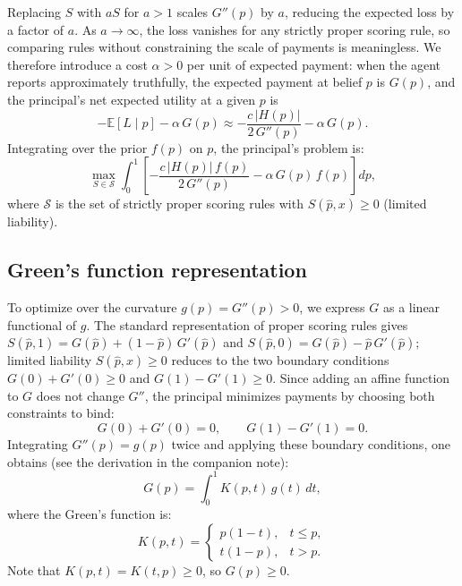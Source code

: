 \documentclass[11pt]{article}
\begin{document}
Replacing $S$ with $aS$ for $a > 1$ scales $G''(p)$ by $a$, reducing the expected loss by a factor of $a$. As $a \to \infty$, the loss vanishes for any strictly proper scoring rule, so comparing rules without constraining the scale of payments is meaningless. We therefore introduce a cost $\alpha > 0$ per unit of expected payment: when the agent reports approximately truthfully, the expected payment at belief $p$ is $G(p)$, and the principal's net expected utility at a given $p$ is
\[
-\mathbb{E}[L \mid p] - \alpha\,G(p) \approx -\frac{c\,|H(p)|}{2\,G''(p)} - \alpha\,G(p).
\]
Integrating over the prior $f(p)$ on $p$, the principal's problem is:
\begin{equation}\label{eq:ri-principal-problem}
\max_{S \in \mathcal{S}} \int_0^1 \left[-\frac{c\,|H(p)|\,f(p)}{2\,G''(p)} - \alpha\,G(p)\,f(p)\right] dp,
\end{equation}
where $\mathcal{S}$ is the set of strictly proper scoring rules with $S(\hat{p},x) \geq 0$ (limited liability).

\subsection{Green's function representation}

To optimize over the curvature $g(p) = G''(p) > 0$, we express $G$ as a linear functional of $g$. The standard representation of proper scoring rules gives $S(\hat{p},1) = G(\hat{p}) + (1-\hat{p})\,G'(\hat{p})$ and $S(\hat{p},0) = G(\hat{p}) - \hat{p}\,G'(\hat{p})$; limited liability $S(\hat{p},x) \geq 0$ reduces to the two boundary conditions $G(0) + G'(0) \geq 0$ and $G(1) - G'(1) \geq 0$. Since adding an affine function to $G$ does not change $G''$, the principal minimizes payments by choosing both constraints to bind:
\[
G(0) + G'(0) = 0, \qquad G(1) - G'(1) = 0.
\]
Integrating $G''(p) = g(p)$ twice and applying these boundary conditions, one obtains (see the derivation in the companion note):
\begin{equation}\label{eq:greens}
G(p) = \int_0^1 K(p,t)\,g(t)\,dt,
\end{equation}
where the Green's function is:
\begin{equation}\label{eq:kernel}
K(p,t) = \begin{cases} p(1-t), & t \leq p, \\ t(1-p), & t > p. \end{cases}
\end{equation}
Note that $K(p,t) = K(t,p) \geq 0$, so $G(p) \geq 0$.
\end{document}
